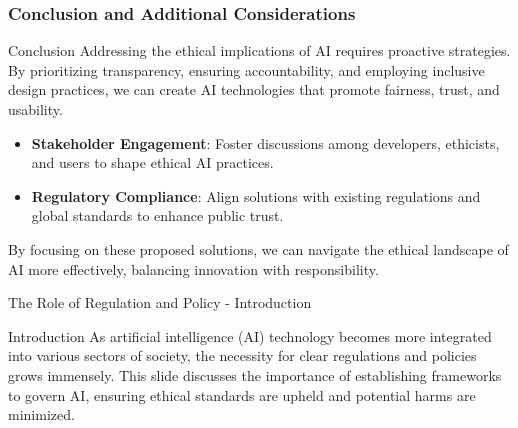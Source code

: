 \documentclass[aspectratio=169]{beamer}
\begin{document}
\begin{frame}[fragile]
    \frametitle{Conclusion and Additional Considerations}

    \begin{block}{Conclusion}
        Addressing the ethical implications of AI requires proactive strategies. By prioritizing transparency, ensuring accountability, and employing inclusive design practices, we can create AI technologies that promote fairness, trust, and usability.
    \end{block}

    \begin{itemize}
        \item \textbf{Stakeholder Engagement}: Foster discussions among developers, ethicists, and users to shape ethical AI practices.
        \item \textbf{Regulatory Compliance}: Align solutions with existing regulations and global standards to enhance public trust.
    \end{itemize}

    By focusing on these proposed solutions, we can navigate the ethical landscape of AI more effectively, balancing innovation with responsibility.
\end{frame}

\begin{frame}[fragile]{The Role of Regulation and Policy - Introduction}
    \begin{block}{Introduction}
        As artificial intelligence (AI) technology becomes more integrated into various sectors of society, the necessity for clear regulations and policies grows immensely. This slide discusses the importance of establishing frameworks to govern AI, ensuring ethical standards are upheld and potential harms are minimized.
    \end{block}
\end{frame}
\end{document}
